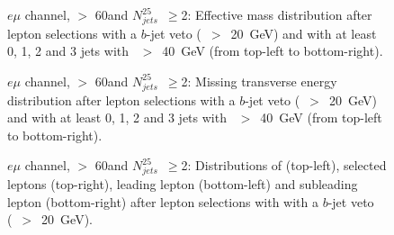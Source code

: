 \begin{figure}[h!]
\centering
{}
\caption{$e\mu$ channel, \met $>$ 60\GeV and $N_{jets}^{25}$~$\ge$2: Effective mass distribution after lepton selections with a $b$-jet veto (\pt~$>$~20~GeV) and with at least 0, 1, 2 and 3 jets with \pt~$>$~40~GeV (from top-left to bottom-right).}
\label{Fig:VP_em_0b_Meff}
\end{figure}
\begin{figure}[h!]
\centering
{}
\caption{$e\mu$ channel, \met $>$ 60\GeV and $N_{jets}^{25}$~$\ge$2: Missing transverse energy distribution after lepton selections with a $b$-jet veto (\pt~$>$~20~GeV) and with at least 0, 1, 2 and 3 jets with \pt~$>$~40~GeV (from top-left to bottom-right).}
\label{Fig:VP_em_0b_Met}
\end{figure} 
\begin{figure}[h!]
\centering
{}
\caption{$e\mu$ channel, \met $>$ 60\GeV and $N_{jets}^{25}$~$\ge$2: Distributions of \mt (top-left), selected leptons \pt (top-right), leading lepton \pt (bottom-left) and subleading lepton \pt (bottom-right) after lepton selections with with a $b$-jet veto (\pt~$>$~20~GeV).}
\label{Fig:VP_em_0b_Njets_and_other}
\end{figure} 



